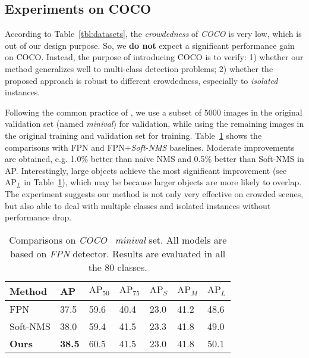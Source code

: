 \documentclass[10pt,twocolumn,letterpaper]{article}
\begin{document}
\subsection{Experiments on COCO}

According to Table~\ref{tbl:datasets}, the \emph{crowdedness} of \emph{COCO} \cite{lin2014microsoft} is very low, which is out of our design purpose. So, we \textbf{do not} expect a significant performance gain on COCO. Instead, the purpose of introducing COCO is to verify: 1) whether our method generalizes well to multi-class detection problems; 2) whether the proposed approach is robust to different crowdedness, especially to \emph{isolated} instances.  

Following the common practice of \cite{lin2017feature,lin2017focal}, we use a subset of 5000 images in the original validation set (named \emph{minival}) for validation, while using the remaining images in the original training and validation set for training. Table~\ref{tbl:mscoco_eval} shows the comparisons with FPN and FPN+\emph{Soft-NMS} baselines. Moderate improvements are obtained, e.g. 1.0\% better than na\"ive NMS and 0.5\% better than Soft-NMS in AP. Interestingly, large objects achieve the most significant improvement (see $\text{AP}_L$ in Table~\ref{tbl:mscoco_eval}), which may be because larger objects are more likely to overlap. The experiment suggests our method is not only very effective on crowded scenes, but also able to deal with multiple classes and isolated instances without performance drop. 

\begin{table}[t]
   \centering
   \begin{tabular}{p{15mm}|p{8mm}<{\centering}p{6mm}<{\centering}p{6mm}<{\centering}|p{6mm}<{\centering}p{6mm}<{\centering}p{6mm}<{\centering}}
   \toprule
   Method & AP & $\text{AP}_{50}$ & $\text{AP}_{75}$ &  $\text{AP}_{S}$ & $\text{AP}_{M}$  & $\text{AP}_{L}$\\
   \hline
   FPN & 37.5 & 59.6 & 40.4 & 23.0 & 41.2 & 48.6 \\
   Soft-NMS & 38.0 & 59.4 & 41.5 & 23.3 & 41.8 & 49.0 \\
   \hline
   \textbf{Ours} & \textbf{38.5} & 60.5 & 41.5 & 23.0  &  41.8  & 50.1 \\

   \bottomrule
   \end{tabular}
   \caption{Comparisons on \emph{COCO}~\cite{lin2014microsoft} \emph{minival} set. All models are based on \emph{FPN} detector. Results are evaluated in all the 80 classes.  }
   \label{tbl:mscoco_eval}
\end{table}
\end{document}
